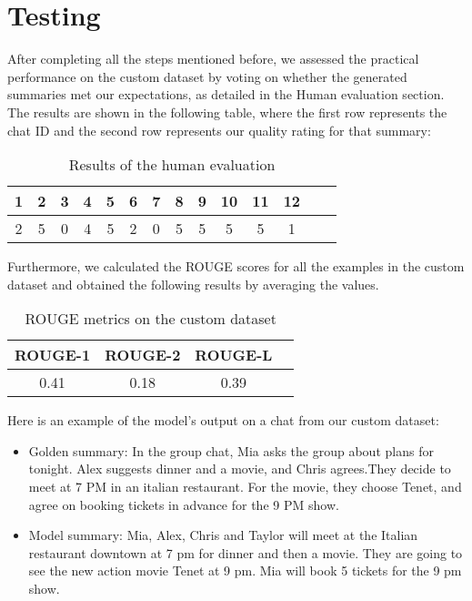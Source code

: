 \documentclass[10pt,twocolumn,letterpaper]{article}
\begin{document}
\section{Testing}
After completing all the steps mentioned before, we assessed the practical performance on the custom dataset by voting on whether the generated summaries met our expectations, as detailed in the Human evaluation section. The results are shown in the following table, where the first row represents the chat ID and the second row represents our quality rating for that summary:
\FloatBarrier
\begin{table}[h!]
    \centering
    \begin{tabular}{|c|c|c|c|c|c|c|c|c|c|c|c|c|c|}
        \hline
        \rowcolor{lightergray}
        1 & 2 & 3 & 4 & 5 & 6 & 7 & 8 & 9 & 10 & 11 & 12 \\ 
        \hline
        2 & 5 & 0 & 4 & 5 & 2 & 0 & 5 & 5 & 5 & 5 & 1\\
        \hline
    \end{tabular}
\caption{Results of the human evaluation}
\label{table:humanEval}
\end{table} 
\FloatBarrier \noindent
Furthermore, we calculated the ROUGE scores for all the examples in the custom dataset and obtained the following results by averaging the values.
\FloatBarrier
\begin{table}[h!]
    \centering
    \begin{tabular}{|c|c|c|c|}
        \hline
        \rowcolor{lightergray}
        ROUGE-1 & ROUGE-2 & ROUGE-L \\ 
        \hline
        0.41 & 0.18 & 0.39  \\
        \hline
    \end{tabular}
\caption{ROUGE metrics on the custom dataset}
\label{table:ROUGEcustom}
\end{table} 
\FloatBarrier \noindent
Here is an example of the model’s output on a chat from our custom dataset:
\begin{itemize}
    \item Golden summary: In the group chat, Mia asks the group about plans for tonight. Alex suggests
    dinner and a movie, and Chris agrees.They decide to meet at 7 PM in an
    italian restaurant. For the movie, they choose Tenet, and agree on booking
    tickets in advance for the 9 PM show.
    \item Model summary: Mia, Alex, Chris and Taylor will meet at the Italian restaurant downtown at 7 pm for dinner and then a movie. They are going to see the new action movie Tenet at 9 pm. Mia will book 5 tickets for the 9 pm show.
\end{itemize}
\end{document}
